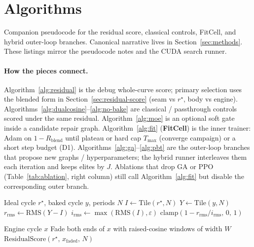 \section{Algorithms}
\label{app:algorithms}

Companion pseudocode for the residual score, classical controls, FitCell, and hybrid outer-loop branches.
Canonical narrative lives in Section~\ref{sec:methods}.
These listings mirror the
pseudocode notes
and the CUDA search runner.

\paragraph{How the pieces connect.}
Algorithm~\ref{alg:residual} is the debug whole-curve score; primary selection uses the blended form in Section~\ref{sec:residual-score} (seam vs $r^{\star}$, body vs engine).
Algorithms~\ref{alg:dualcosine}--\ref{alg:no-bake} are classical / passthrough controls scored under the same residual.
Algorithm~\ref{alg:moe} is an optional soft gate inside a candidate repair graph.
Algorithm~\ref{alg:fit} (\textbf{FitCell}) is the inner trainer: Adam on $1-R_{\mathrm{blend}}$ until plateau or hard cap $T_{\max}$ (converge campaign) or a short step budget (D1).
Algorithms~\ref{alg:ga}--\ref{alg:pbt} are the outer-loop branches that propose new graphs / hyperparameters; the hybrid runner interleaves them each iteration and keeps elites by $J$.
Ablations that drop GA or PPO (Table~\ref{tab:ablation}, right column) still call Algorithm~\ref{alg:fit} but disable the corresponding outer branch.

\begin{algorithm}[H]
\caption{ResidualScore}
\label{alg:residual}
\begin{algorithmic}[1]
\Require Ideal cycle $r^{\star}$, baked cycle $y$, periods $N$
\State $I \gets \mathrm{Tile}(r^{\star}, N)$
\State $Y \gets \mathrm{Tile}(y, N)$
\State $r_{\mathrm{rms}} \gets \mathrm{RMS}(Y-I)$
\State $i_{\mathrm{rms}} \gets \max(\mathrm{RMS}(I), \varepsilon)$
\State \Return $\mathrm{clamp}(1 - r_{\mathrm{rms}}/i_{\mathrm{rms}},\,0,\,1)$
\end{algorithmic}
\end{algorithm}

\begin{algorithm}[H]
\caption{DualCosine baseline}
\label{alg:dualcosine}
\begin{algorithmic}[1]
\Require Engine cycle $x$
\State Fade both ends of $x$ with raised-cosine windows of width $W$
\State \Return $\mathrm{ResidualScore}(r^{\star},\,x_{\mathrm{faded}},\,N)$
\end{algorithmic}
\end{algorithm}


